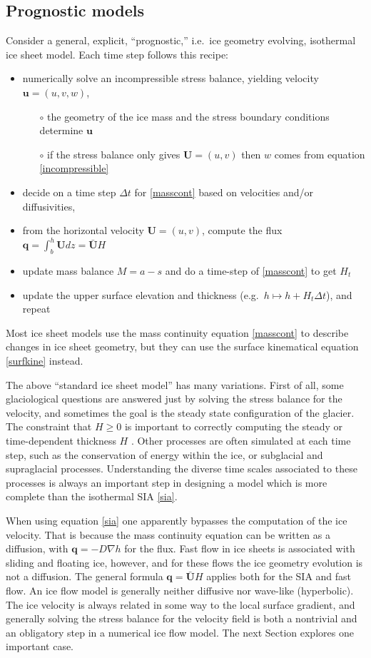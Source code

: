 \documentclass[letterpaper,final,12pt,reqno]{amsart}
\newcommand{\bq}{\mathbf{q}}
\newcommand{\bU}{\mathbf{U}}
\begin{document}
\subsection*{Prognostic models}  Consider a general, explicit, ``prognostic,'' i.e.~ice geometry evolving, isothermal ice sheet model.  Each time step follows this recipe:
  \begin{itemize}
  \item numerically solve an incompressible stress balance, yielding velocity $\mathbf{u}=(u,v,w)$,
    \begin{itemize}
    \item[$\circ$] the geometry of the ice mass and the stress boundary conditions determine $\mathbf{u}$
    \item[$\circ$] if the stress balance only gives $\mathbf{U}=(u,v)$ then $w$ comes from equation \eqref{incompressible}
    \end{itemize}
  \item decide on a time step $\Delta t$ for \eqref{masscont} based on velocities and/or diffusivities,
  \item from the horizontal velocity $\mathbf{U}=(u,v)$, compute the flux $\bq = \int_b^h \bU dz = \bar{\bU} H$
  \item update mass balance $M=a-s$ and do a time-step of \eqref{masscont} to get $H_t$
  \item update the upper surface elevation and thickness (e.g.~$h \mapsto h + H_t \Delta t$), and repeat
  \end{itemize}
Most ice sheet models use the mass continuity equation \eqref{masscont} to describe changes in ice sheet geometry, but they can use the surface kinematical equation \eqref{surfkine} instead.

The above ``standard ice sheet model'' has many variations.  First of all, some glaciological questions are answered just by solving the stress balance for the velocity, and sometimes the goal is the steady state configuration of the glacier.  The constraint that $H\ge 0$ is important to correctly computing the steady or time-dependent thickness $H$ \cite{Bueler2016,JouvetBueler2012}.  Other processes are often simulated at each time step, such as the conservation of energy within the ice, or subglacial and supraglacial processes.  Understanding the diverse time scales associated to these processes is always an important step in designing a model which is more complete than the isothermal SIA \eqref{sia}.

When using equation \eqref{sia} one apparently bypasses the computation of the ice velocity.  That is because the mass continuity equation can be written as a diffusion, with $\bq=-D\nabla h$ for the flux.  Fast flow in ice sheets is associated with sliding and floating ice, however, and for these flows the ice geometry evolution is not a diffusion.  The general formula $\bq = \bar{\bU} H$ applies both for the SIA and fast flow.  An ice flow model is generally neither diffusive nor wave-like (hyperbolic).  The ice velocity is always related in some way to the local surface gradient, and generally solving the stress balance for the velocity field is both a nontrivial and an obligatory step in a numerical ice flow model.  The next Section explores one important case.
\end{document}
